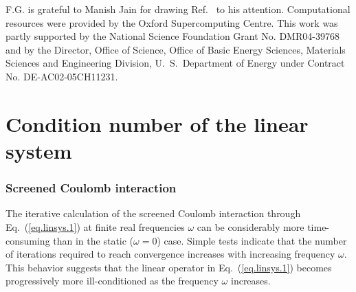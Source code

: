 \documentclass[twocolumn,prb,showpacs,superscriptaddress]{revtex4}
\def\w{\omega}
\begin{document}
\begin{acknowledgments}
F.G. is grateful to Manish Jain for drawing Ref.\  to his attention.
Computational resources were provided by the Oxford Supercomputing Centre.
This work was partly supported by the National Science Foundation Grant No. DMR04-39768 and by
the Director, Office of Science, Office of Basic Energy Sciences, Materials Sciences
and Engineering Division, U.\ S.\ Department of Energy under Contract No. DE-AC02-05CH11231.
\end{acknowledgments}

\appendix

\section{Condition number of the linear system}\label{app.condition}

\subsubsection{Screened Coulomb interaction}

The iterative calculation of the screened Coulomb interaction through 
Eq.\ (\ref{eq.linsys.1}) at finite real
frequencies $\w$ can be considerably more time-consuming than in the static
($\w\!=\!0$) case. Simple tests indicate that 
the number of iterations required to reach convergence increases with 
increasing frequency $\w$. This behavior suggests that the linear operator in
Eq.\ (\ref{eq.linsys.1}) becomes progressively more ill-conditioned 
as the frequency $\w$ increases.
\end{document}
